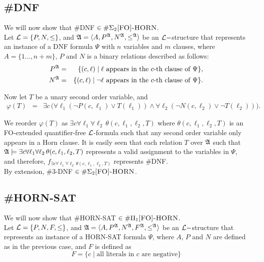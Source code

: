 \subsection{{\sc \#DNF}}
We will now show that {\sc \#DNF} $\in\#\Sigma_2\textsc{[FO]-HORN}$.\\

Let ${\cal L} = \{P,N,\leq\}$, and ${\frak A} = \langle A, P^{\frak A}, N^{\frak A}, \leq^{\frak A} \rangle$ be an ${\cal L}-$structure that represents an instance of a {\sc DNF} formula $\Psi$ with $n$ variables and $m$ clauses, where $A = \{1\ldots,n+m\}$, $P$ and $N$ is a binary relations described as follows:
\begin{eqnarray*}
P^{\frak A} &=& \{(c,\ell)\mid \ell \mbox{ appears in the $c$-th clause of }\Psi\},\\
N^{\frak A} &=& \{(c,\ell)\mid \neg \ell \mbox{ appears in the $c$-th clause of }\Psi\}.
\end{eqnarray*}

Now let $T$ be a unary second order variable, and
\begin{eqnarray*}
\varphi(T) &=& \exists c \,\Big(\forall \ell_1 (\neg P(c,\ell_1) \vee T(\ell_1)) \wedge \forall \ell_2 (\neg N(c,\ell_2) \vee \neg T(\ell_2))\Big). 
\end{eqnarray*}

We reorder $\varphi(T)$ as $\exists c \forall \ell_1 \forall \ell_2\, \theta(c,\ell_1,\ell_2,T)$ where $\theta(c,\ell_1,\ell_2,T)$ is an {\sc FO}-extended quantifier-free ${\cal L}$-formula such that any second order variable only appears in a Horn clause. It is easily seen that each relation $T$ over ${\frak A}$ such that ${\frak A}\models \exists c \forall \ell_1 \forall \ell_2\, \theta(c,\ell_1,\ell_2,T)$ represents a valid assignment to the variables in $\Psi$, and therefore, $f_{\exists c \forall \ell_1 \forall \ell_2\, \theta(c,\ell_1,\ell_2,T)}$ represents {\sc \#DNF}.\\

By extension, {\sc \#3-DNF} $\in\#\Sigma_2\textsc{[FO]-HORN}$.

\subsection{{\sc \#HORN-SAT}}
We will now show that {\sc \#HORN-SAT} $\in\#\Pi_1\textsc{[FO]-HORN}$.\\

Let ${\cal L} = \{P,N,F,\leq\}$, and ${\frak A} = \langle A, P^{\frak A}, N^{\frak A}, F^{\frak A}, \leq^{\frak A} \rangle$ be an ${\cal L}-$structure that represents an instance of a {\sc HORN-SAT} formula $\Psi$, where $A$, $P$ and $N$ are defined as in the previous case, and $F$ is defined as
\[
	F = \{ c \mid
		\mbox{all literals in $c$ are negative}
	\}
\]

